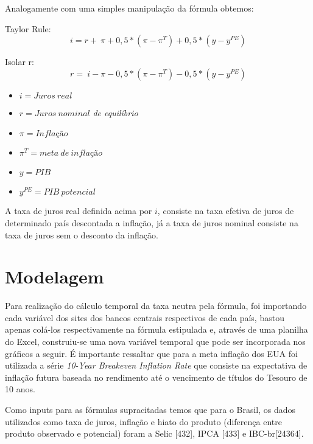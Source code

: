  Analogamente com uma simples manipula\c{c}\~{a}o da f\'{o}rmula obtemos: 

Taylor Rule: 
\[i=r+~\pi +0,5*\left(\pi -{\pi }^T\right)+0,5*\left(y-y^{PE}\right)\] 

Isolar r: 
\[r=~i-\pi -0,5*\left(\pi -{\pi }^T\right)-0,5*\left(y-y^{PE}\right)\] 


\begin{itemize}
\item  $i=Juros~real$

\item  $r=Juros~nominal$\textit{ de equil\'{i}brio }

\item  $\pi =Infla\textrm{\c{c}}\textrm{\~{a}}o$

\item  ${\pi }^T=meta~de~infla\textrm{\c{c}}\textrm{\~{a}}o~$

\item  $y=PIB$

\item  $y^{PE}=PIB~potencial$
\end{itemize}

A taxa de juros real definida acima por $i$, consiste na taxa efetiva de juros de determinado pa\'{i}s descontada a infla\c{c}\~{a}o, j\'{a} a taxa de juros nominal consiste na taxa de juros sem o desconto da infla\c{c}\~{a}o. 

\section{Modelagem}

Para realiza\c{c}\~{a}o do c\'{a}lculo temporal da taxa neutra pela f\'{o}rmula, foi importando cada vari\'{a}vel dos sites dos bancos centrais respectivos de cada pa\'{i}s, bastou apenas col\'{a}-los respectivamente na f\'{o}rmula estipulada e, atrav\'{e}s de uma planilha do Excel, construiu-se uma nova vari\'{a}vel temporal que pode ser incorporada nos gr\'{a}ficos a seguir. \'{E} importante ressaltar que para a meta infla\c{c}\~{a}o dos EUA foi utilizada a s\'{e}rie \textit{10-Year Breakeven Inflation Rate }que consiste na expectativa de infla\c{c}\~{a}o futura baseada no rendimento at\'{e} o vencimento de t\'{i}tulos do Tesouro de 10 anos. \textbf{}

 Como inputs para as f\'{o}rmulas supracitadas temos que para o Brasil, os dados utilizados como taxa de juros, infla\c{c}\~{a}o e hiato do produto (diferen\c{c}a entre produto observado e potencial) foram a Selic [432], IPCA [433] e IBC-br[24364]. 

